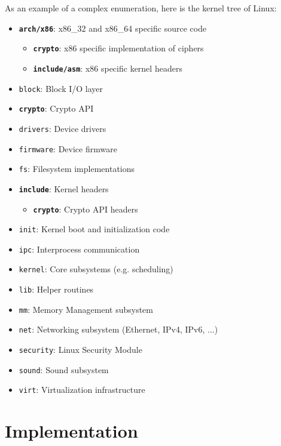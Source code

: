 \documentclass[10pt,twoside,a4paper,bibliography=totoc]{scrbook}
\newcommand{\code}[1]{\texttt{#1}}
\begin{document}
As an example of a complex enumeration, here is
the kernel tree of Linux:
%
\begin{itemize}
	\item {\bf\code{arch/x86}}: x86\_32 and x86\_64 specific source code
	\begin{itemize}
		\item {\bf\code{crypto}}: x86 specific implementation of ciphers
		\item {\bf\code{include/asm}}: x86 specific kernel headers
	\end{itemize}
	\item \code{block}: Block I/O layer
	\item {\bf\code{crypto}}: Crypto API
	\item \code{drivers}: Device drivers
	\item \code{firmware}: Device firmware
	\item \code{fs}: Filesystem implementations
	\item {\bf\code{include}}: Kernel headers
	\begin{itemize}
		\item {\bf\code{crypto}}: Crypto API headers
	\end{itemize}
	\item \code{init}: Kernel boot and initialization code
	\item \code{ipc}: Interprocess communication
	\item \code{kernel}: Core subsystems (e.g. scheduling)
	\item \code{lib}: Helper routines
	\item \code{mm}: Memory Management subsystem
	\item \code{net}: Networking subsystem (Ethernet, IPv4, IPv6, ...)
	\item \code{security}: Linux Security Module
	\item \code{sound}: Sound subsystem
	\item \code{virt}: Virtualization infrastructure
\end{itemize}

\Blindtext[2][1]
%
% 


\chapter{Implementation}
\label{sec:implementation}
\end{document}
